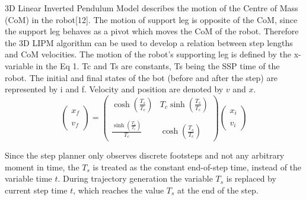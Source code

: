 \documentclass[letterpaper, 10 pt, conference]{ieeeconf}  %
\begin{document}
3D Linear Inverted Pendulum Model describes the motion of the Centre of Mass (CoM) in the robot[12]. The motion of support leg is opposite of the CoM, since the support leg behaves as a pivot which moves the CoM of the robot. Therefore the 3D LIPM algorithm can be used to develop a relation between step lengths and CoM velocities. The motion of the robot's supporting leg is defined by the x-variable in the Eq 1. Tc and Ts are constants, Ts being the SSP time of the robot. The initial and final states of the bot (before and after the step) are represented by i and f. Velocity and position are denoted by $v$ and $x$.
\\

\begin{equation}
\left(\begin{array}{c}x_{f}\\\\ v_{f}\end{array}\right)=\left(\begin{array}{cc}\cosh\left(\frac{T_{s}}{T_{c}}\right) & T_{c}\sinh\left(\frac{T_{s}}{T_{c}}\right) \\\\ \frac{\sinh\left(\frac{T_{s}}{T_{c}}\right)}{T_{c}} & \cosh\left(\frac{T_{s}}{T_{c}}\right)\end{array}\right)\left(\begin{array}{c}x_{i}\\\\ v_{i}\end{array}\right)
\end{equation}

Since the step planner only observes discrete footsteps and not any arbitrary moment in time, the $T_{s}$ is treated as the constant end-of-step time, instead of the variable time $t$. During trajectory generation the variable $T_{s}$ is replaced by current step time $t$, which reaches the value $T_{s}$ at the end of the step.
\end{document}
